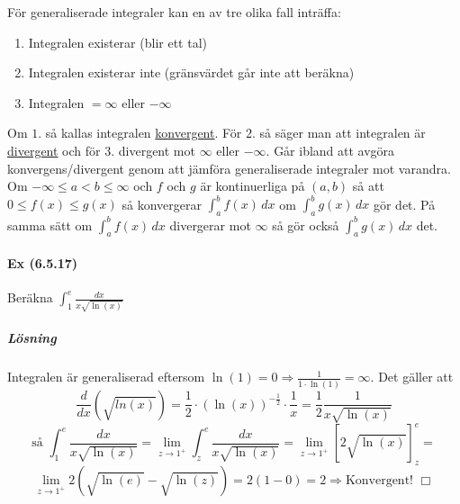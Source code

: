 För generaliserade integraler kan en av tre olika fall inträffa:
\begin{enumerate}
    \item Integralen existerar (blir ett tal)
    \item Integralen existerar inte (gränsvärdet går inte att beräkna)
    \item Integralen $=\infty$ eller $-\infty$
\end{enumerate}
Om $1.$ så kallas integralen \underline{konvergent}.
För $2.$ så säger man att integralen är \underline{divergent} och för $3.$ divergent mot $\infty$ eller $-\infty$.
Går ibland att avgöra konvergens/divergent genom att jämföra generaliserade integraler mot varandra.
Om $-\infty\leq a<b \leq\infty$ och $f$ och $g$ är kontinuerliga på $(a,b)$ så att $0\leq f(x)\leq g(x)$ så konvergerar $\int_a^b f(x)\, dx$ om $\int_a^b g(x)\, dx$ gör det.
På samma sätt om $\int_a^b f(x)\, dx$ divergerar mot $\infty$ så gör också $\int_a^b g(x)\, dx$ det.

\paragraph{Ex (6.5.17)} Beräkna $\int_1^e\frac{dx}{x\sqrt{\ln(x)}}$
\subparagraph{Lösning}
Integralen är generaliserad eftersom $\ln(1)=0\Rightarrow\frac{1}{1\cdot\ln(1)}=\infty$.
Det gäller att
\begin{equation*}
    \frac{d}{dx}(\sqrt{ln(x)})=
    \frac{1}{2}\cdot(\ln(x))^{-\frac{1}{2}}\cdot\frac{1}{x}=
    \frac{1}{2}\frac{1}{x\sqrt{\ln(x)}}
\end{equation*}
\begin{equation*}
    \text{så }\int_1^e\frac{dx}{x\sqrt{\ln(x)}}=
    \lim_{z\to 1^+}\int_z^e\frac{dx}{x\sqrt{\ln(x)}}=
    \lim_{z\to 1^+}[2\sqrt{\ln(x)}]_z^e=
\end{equation*}
\begin{equation*}
    \lim_{z\to 1^+}2(\sqrt{\ln(e)}-\sqrt{\ln(z)})=
    2(1-0)=2\Rightarrow\text{Konvergent! }\Box
\end{equation*}

